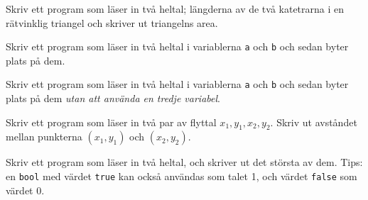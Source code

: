 \begin{exercise}
Skriv ett program som läser in två heltal; längderna av de två katetrarna i en rätvinklig triangel och skriver ut triangelns area.
\end{exercise}
Skriv ett program som läser in två heltal i variablerna \texttt{a} och \texttt{b} och sedan byter plats på dem.
\begin{exercise}
Skriv ett program som läser in två heltal i variablerna \texttt{a} och \texttt{b} och sedan byter plats på dem \emph{utan att använda en tredje variabel}.
\end{exercise}
Skriv ett program som läser in två par av flyttal $x_1, y_1, x_2, y_2$. Skriv ut avståndet mellan punkterna $(x_1, y_1)$ och $(x_2, y_2)$.
\begin{exercise}
\end{exercise}
\begin{exercise}
\end{exercise}
\begin{exercise}
\end{exercise}
\begin{exercise}
\end{exercise}
\begin{exercise}
\end{exercise}
\begin{exercise}
\end{exercise}
\begin{exercise}
\end{exercise}
\begin{exercise}
\end{exercise}
\begin{exercise}
Skriv ett program som läser in två heltal, och skriver ut det största av dem. Tips: en \texttt{bool} med värdet \texttt{true} kan också användas som talet 1, och värdet \texttt{false} som värdet 0.
\end{exercise}